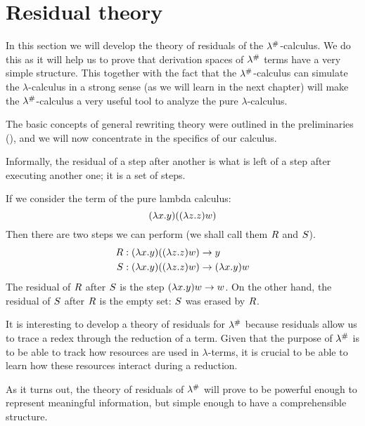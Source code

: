 \chapter{Residual theory}
In this section we will develop the theory of residuals of the $\lambda^{\mathtt{\#}}$-calculus.
We do this as it will help us to prove that derivation spaces of $\lambda^{\mathtt{\#}}$
terms have a very simple structure. This together with the fact that
the $\lambda^{\mathtt{\#}}$-calculus
can simulate the $\lambda$-calculus in a strong sense (as we will learn in the next chapter)
will make the $\lambda^{\mathtt{\#}}$-calculus a very useful tool
to analyze the pure $\lambda$-calculus.


The basic concepts of general rewriting theory were outlined in
the preliminaries (),
and we will now concentrate in the specifics of our calculus.

Informally, the residual of a step after another is what is left of a step after executing another one; it is a set of steps.

\begin{example} If we consider the term of the pure lambda calculus:
\[(\lambda x. y)((\lambda z. z) w)\]
Then there are two steps we can perform (we shall call them $R$ and $S$).
\begin{align*}
  R &:
    (\lambda x. y)((\lambda z. z) w) \to y \\
  S &:
    (\lambda x. y)((\lambda z. z) w) \to (\lambda x. y) w
\end{align*}
The residual of $R$ after $S$ is the step $(\lambda x. y) w \to w$.
On the other hand, the residual of $S$ after $R$ is the empty set:
$S$ was erased by $R$.
\end{example}

It is interesting to develop a theory of residuals for $\lambda^{\mathtt{\#}}$ because
residuals allow us to trace a redex through the reduction of a term.
Given that the purpose of $\lambda^{\mathtt{\#}}$ is to be able to track
how resources are used in $\lambda$-terms, it is crucial to
be able to learn how these resources interact during a reduction.

As it turns out, the theory of residuals of $\lambda^{\mathtt{\#}}$ will prove to be powerful
enough to represent meaningful information, but simple enough to have a
comprehensible structure.



